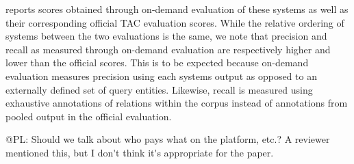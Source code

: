  reports scores obtained through on-demand evaluation of these systems as well as their corresponding official TAC evaluation scores.
While the relative ordering of systems between the two evaluations is the same, we note that precision and recall as measured through on-demand evaluation are respectively higher and lower than the official scores.
This is to be expected because on-demand evaluation measures precision using each systems output as opposed to an externally defined set of query entities.
Likewise, recall is measured using exhaustive annotations of relations within the corpus instead of annotations from pooled output in the official evaluation.  


\ac{@PL: Should we talk about who pays what on the platform, etc.? A reviewer mentioned this, but I don't think it's appropriate for the paper.}
